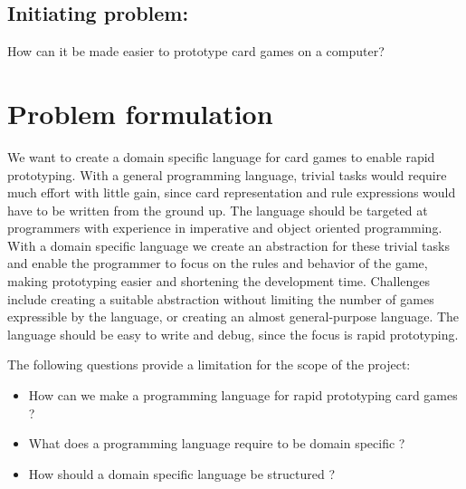 \section{Initiating problem:}
How can it be made easier to prototype card games on a computer? 
\chapter{Problem formulation}
We want to create a domain specific language for card games to enable rapid prototyping. With a 
general programming language, trivial tasks would require much effort with little gain, since card 
representation and rule expressions would have to be written from the ground up. The language should be targeted at programmers with experience in imperative and object oriented programming. With a domain specific language we create an abstraction for these trivial tasks and enable the programmer to focus on the rules and behavior of the game, making prototyping easier and shortening the development time. 
Challenges include creating a suitable abstraction without limiting the number of games expressible
by the language, or creating an almost general-purpose language. The language should be easy to write and debug, since the focus is rapid prototyping.

The following questions provide a limitation for the scope of the project:

\begin{itemize}
\item How can we make a programming language for rapid prototyping card games ?
\item What does a programming language require to be domain specific ?
\item How should a domain specific language be structured ?
\end{itemize}